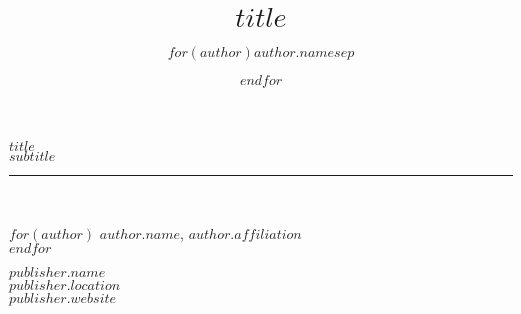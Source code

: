 \documentclass{book}
\title{$title$}
\author{$for(author)$$author.name$$sep$ \and $endfor$}
\begin{document}
\frontmatter

\begin{titlepage}
\begin{flushleft}

\textbf{\fontsize{48}{54}\selectfont $title$ \\}
\textbf{\large \textit{$subtitle$}}

\par\noindent\rule{\textwidth}{4pt}\\

\begin{flushright}

  $for(author)$
    \textbf{$author.name$}, \emph{$author.affiliation$}\\
  $endfor$

\end{flushright}

\vspace{\fill}

\end{flushleft}

\begin{center}
  \small{$publisher.name$\\
  $publisher.location$\\
  $publisher.website$}
\end{center}
  
\end{titlepage}
\restoregeometry

\thispagestyle{empty}
\end{document}
